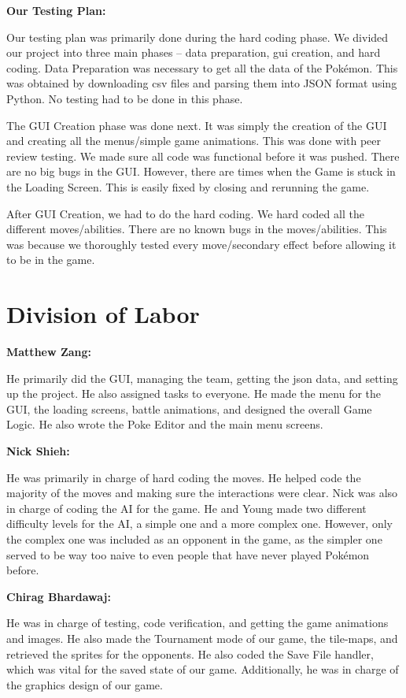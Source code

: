 \documentclass{scrreprt}
\begin{document}
\textbf{Our Testing Plan: }

Our testing plan was primarily done during the hard coding phase. We divided our project into three main phases -- data preparation, gui creation, and hard coding. Data Preparation was necessary to get all the data of the Pok\'emon. This was obtained by downloading csv files and parsing them into JSON format using Python. No testing had to be done in this phase.

The GUI Creation phase was done next. It was simply the creation of the GUI and creating all the menus/simple game animations. This was done with peer review testing. We made sure all code was functional before it was pushed. There are no big bugs in the GUI. However, there are times when the Game is stuck in the Loading Screen. This is easily fixed by closing and rerunning the game. 

After GUI Creation, we had to do the hard coding. We hard coded all the different moves/abilities. There are no known bugs in the moves/abilities. This was because we thoroughly tested every move/secondary effect before allowing it to be in the game. 

\section{Division of Labor} 

\textbf{Matthew Zang:}

He primarily did the GUI, managing the team, getting the json data, and setting up the project. He also assigned tasks to everyone. He made the menu for the GUI, the loading screens, battle animations, and designed the overall Game Logic. He also wrote the Poke Editor and the main menu screens.

\textbf{Nick Shieh:}

He was primarily in charge of hard coding the moves. He helped code the majority of the moves and making sure the interactions were clear. Nick was also in charge of coding the AI for the game. He and Young made two different difficulty levels for the AI, a simple one and a more complex one. However, only the complex one was included as an opponent in the game, as the simpler one served to be way too naive to even people that have never played Pok\'emon before. 

\textbf{Chirag Bhardawaj:} 

He was in charge of testing, code verification, and getting the game animations and images. He also made the Tournament mode of our game, the tile-maps, and retrieved the sprites for the opponents. He also coded the Save File handler, which was vital for the saved state of our game. Additionally, he was in charge of the graphics design of our game. 
\end{document}
